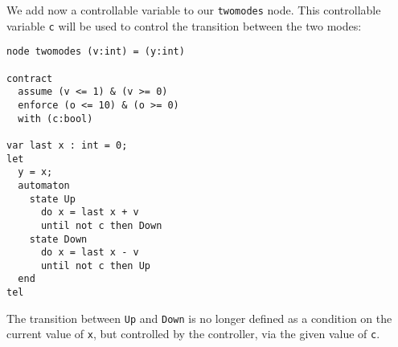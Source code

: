\documentclass[a4paper]{article}
\begin{document}
We add now a controllable variable to our \texttt{twomodes} node. This
controllable variable \texttt{c} will be used to control the
transition between the two modes:

\begin{lstlisting}
node twomodes (v:int) = (y:int)

contract
  assume (v <= 1) & (v >= 0)
  enforce (o <= 10) & (o >= 0)
  with (c:bool)

var last x : int = 0;
let
  y = x;
  automaton
    state Up
      do x = last x + v
      until not c then Down
    state Down
      do x = last x - v
      until not c then Up
  end
tel
\end{lstlisting}

The transition between \texttt{Up} and \texttt{Down} is no longer
defined as a condition on the current value of \texttt{x}, but
controlled by the controller, via the given value of \texttt{c}.
\end{document}
